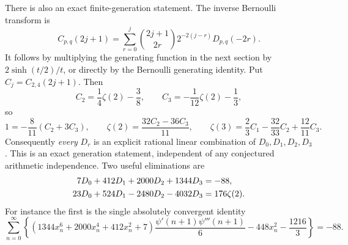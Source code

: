 There is also an exact finite-generation statement. The inverse
Bernoulli transform is
\begin{equation}\label{tail:inverse-transform}
 C_{p,q}(2j+1)=\sum_{r=0}^{j}
          \binom{2j+1}{2r}2^{-2(j-r)}D_{p,q}(-2r).
\end{equation}
It follows by multiplying the generating function in the next
section by \(2\sinh(t/2)/t\), or directly by the Bernoulli
generating identity. Put \(C_j=C_{2,4}(2j+1)\). Then
\[
 C_2=\frac14\zeta(2)-\frac38,
 \qquad C_3=-\frac1{12}\zeta(2)-\frac13,
\]
so
\[
 1=-\frac8{11}(C_2+3C_3),\qquad
 \zeta(2)=\frac{32C_2-36C_3}{11},\qquad
 \zeta(3)=\frac23C_1-\frac{32}{33}C_2+\frac{12}{11}C_3.
\]
Consequently \emph{every} \(D_r\) is an explicit rational linear
combination of \(D_0,D_1,D_2,D_3\). This is an exact generation
statement, independent of any conjectured arithmetic independence.
Two useful eliminations are
\begin{align}\label{tail:24-eliminations}
 7D_0+412D_1+2000D_2+1344D_3&=-88,\notag\\
 23D_0+524D_1-2480D_2-4032D_3&=176\zeta(2).
\end{align}
For instance the first is the single absolutely convergent identity
\begin{equation}\label{tail:rational-polygamma}
 \sum_{n=0}^{\infty}
 \left\{
 (1344x_n^6+2000x_n^4+412x_n^2+7)
       \frac{\psi'(n+1)\psi'''(n+1)}6
       -448x_n^2-\frac{1216}{3}
 \right\}=-88.
\end{equation}

